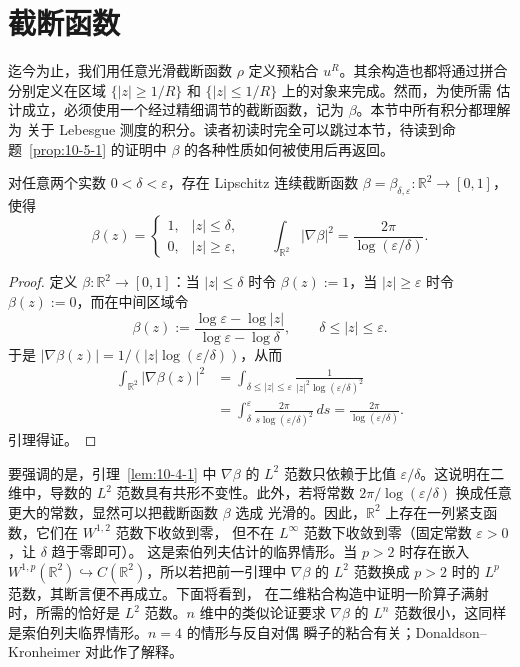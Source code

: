 
\section{截断函数}\label{sec:10-4}

迄今为止，我们用任意光滑截断函数 $\rho$ 定义预粘合 $u^R$。其余构造也都将通过拼合
分别定义在区域 $\{|z|\ge1/R\}$ 和 $\{|z|\le1/R\}$ 上的对象来完成。然而，为使所需
估计成立，必须使用一个经过精细调节的截断函数，记为 $\beta$。本节中所有积分都理解为
关于 Lebesgue 测度的积分。读者初读时完全可以跳过本节，待读到命题~\ref{prop:10-5-1} 的证明中
$\beta$ 的各种性质如何被使用后再返回。

\begin{lemma}\label{lem:10-4-1}
对任意两个实数 $0<\delta<\varepsilon$，存在 Lipschitz 连续截断函数
$\beta=\beta_{\delta,\varepsilon}:\mathbb R^2\to[0,1]$，使得
\[
  \beta(z)=
  \begin{cases}
    1,& |z|\le\delta,\\
    0,& |z|\ge\varepsilon,
  \end{cases}
  \qquad
  \int_{\mathbb R^2}|\nabla\beta|^2
  =\frac{2\pi}{\log(\varepsilon/\delta)}.
\]
\end{lemma}

\begin{proof}
定义 $\beta:\mathbb R^2\to[0,1]$：当 $|z|\le\delta$ 时令 $\beta(z):=1$，当
$|z|\ge\varepsilon$ 时令 $\beta(z):=0$，而在中间区域令
\begin{equation}\label{eq:10-4-1}
  \beta(z):=
  \frac{\log\varepsilon-\log|z|}{\log\varepsilon-\log\delta},
  \qquad \delta\le|z|\le\varepsilon.
\end{equation}
于是 $|\nabla\beta(z)|=1/(|z|\log(\varepsilon/\delta))$，从而
\[
  \begin{aligned}
  \int_{\mathbb R^2}|\nabla\beta(z)|^2
  &=\int_{\delta\le|z|\le\varepsilon}
    \frac{1}{|z|^2\log(\varepsilon/\delta)^2}\\
  &=\int_\delta^\varepsilon
    \frac{2\pi}{s\log(\varepsilon/\delta)^2}\,ds
   =\frac{2\pi}{\log(\varepsilon/\delta)}.
  \end{aligned}
\]
引理得证。
\end{proof}

要强调的是，引理~\ref{lem:10-4-1} 中 $\nabla\beta$ 的 $L^2$ 范数只依赖于比值
$\varepsilon/\delta$。这说明在二维中，导数的 $L^2$ 范数具有共形不变性。此外，若将常数
$2\pi/\log(\varepsilon/\delta)$ 换成任意更大的常数，显然可以把截断函数 $\beta$ 选成
光滑的。因此，$\mathbb R^2$ 上存在一列紧支函数，它们在 $W^{1,2}$ 范数下收敛到零，
但不在 $L^\infty$ 范数下收敛到零（固定常数 $\varepsilon>0$，让 $\delta$ 趋于零即可）。
这是索伯列夫估计的临界情形。当 $p>2$ 时存在嵌入
$W^{1,p}(\mathbb R^2)\hookrightarrow C(\mathbb R^2)$，所以若把前一引理中
$\nabla\beta$ 的 $L^2$ 范数换成 $p>2$ 时的 $L^p$ 范数，其断言便不再成立。下面将看到，
在二维粘合构造中证明一阶算子满射时，所需的恰好是 $L^2$ 范数。$n$ 维中的类似论证要求
$\nabla\beta$ 的 $L^n$ 范数很小，这同样是索伯列夫临界情形。$n=4$ 的情形与反自对偶
瞬子的粘合有关；Donaldson--Kronheimer  对此作了解释。

